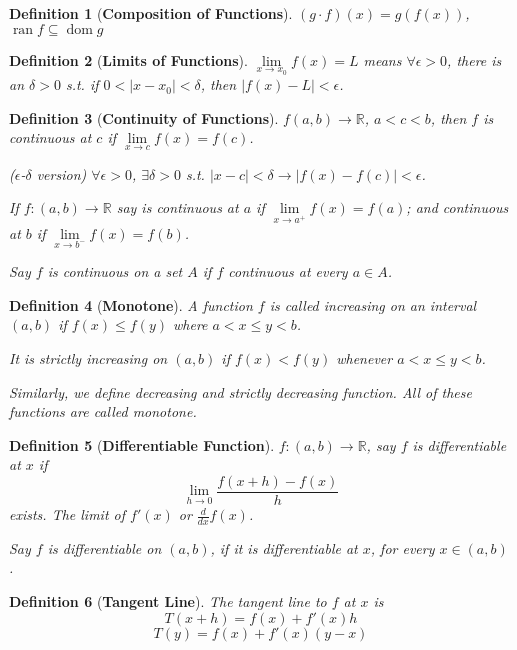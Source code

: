 \documentclass[12pt]{article}
\newcommand{\abs}[1]{\left| #1 \right|}
\theoremstyle{plain}
\newtheorem{definition}{Definition}[section]
\newcommand{\dlim}{\displaystyle\lim\limits}
\DeclareMathOperator{\Dom}{dom}
\DeclareMathOperator{\Ran}{ran}
\begin{document}
	\begin{definition}[\textbf{Composition of Functions}]
		$(g\cdot f)(x)=g(f(x))$, $\Ran f \subseteq \Dom  g$\\
	\end{definition}
	
	\begin{definition}[\textbf{Limits of Functions}]
		$\dlim_{x\to x_0} f(x) = L$ means $\forall \epsilon >0$, there
		is an $\delta>0$ s.t. if $0<\abs{x-x_0}<\delta$,
		then $\abs{f(x)-L}<\epsilon$.\\
	\end{definition}

	\begin{definition}[\textbf{Continuity of Functions}]
		$f(a,b) \to\mathbb{R}$, $a<c<b$, then $f$ is continuous at $c$
		if $\dlim_{x\to c} f(x) =f(c)$.

		($\epsilon$-$\delta$ version) $\forall \epsilon>0$, $\exists \delta >0$ s.t. 
		$\abs{x-c}<\delta \to \abs{f(x)-f(c)}<\epsilon$.

		If $f:(a,b)\to\mathbb{R}$ say is continuous at $a$ if
		$\dlim_{x\to a^+} f(x) = f(a)$; 
		and continuous at $b$ if $\dlim_{x\to b^-}f(x) =f(b)$.

		Say $f$ is continuous on a set $A$ if $f$ continuous at every $a\in A$.\\
	\end{definition}

	\begin{definition}[\textbf{Monotone}]
		A function $f$ is called increasing on an interval $(a,b)$ if 
		$f(x)\leq f(y)$ where $a<x\leq y<b$. 
		
		It is strictly increasing on $(a,b)$
		if $f(x)<f(y)$ whenever $a<x\leq y<b$. 

		Similarly, we define decreasing and strictly decreasing function. 
		All of these functions are called monotone. 
	\end{definition}

	\begin{definition}[\textbf{Differentiable Function}]
		$f:(a,b)\to\mathbb{R}$, say  $f$ is differentiable at $x$ 
		if 
		\[
			\dlim_{h\to 0} \frac{f(x+h)-f(x)}h
		\]
		exists. The limit of $f'(x)$
		or $\frac d{dx} f(x)$. 

		Say $f$ is differentiable on $(a,b)$, if it is differentiable at $x$,
		for every $x\in (a,b)$.\\
	\end{definition}

	\begin{definition}[\textbf{Tangent Line}]
		The tangent line to $f$ at $x$ is 
    \[
			T(x+h) = f(x)+f'(x)h
		\]
    \[
    	T(y) = f(x) + f'(x) (y-x)
    \]\\
	\end{definition}
\end{document}
